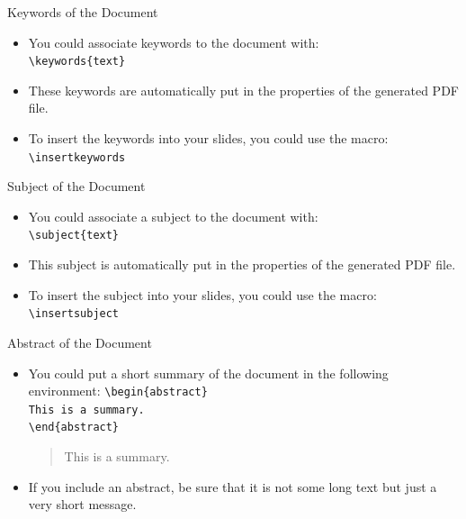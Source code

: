 \documentclass[english,sectioncirclenumberstyle]{le2iutbmbeamer}
\begin{document}
\begin{frame}{Keywords of the Document}
	\begin{itemize}
	\item You could associate keywords to the document with: \\
		\texttt{{\textbackslash}keywords\{text\}}
	\vspace{1em}
	\item These keywords are automatically put in the properties of the generated PDF file.
	\vspace{1em}
	\item To insert the keywords into your slides, you could use the macro: \\
			\texttt{{\textbackslash}insertkeywords}
	\end{itemize}
	\begin{example}
		\insertkeywords
	\end{example}
\end{frame}

\begin{frame}{Subject of the Document}
	\begin{itemize}
	\item You could associate a subject to the document with: \\
		\texttt{{\textbackslash}subject\{text\}}
	\vspace{1em}
	\item This subject is automatically put in the properties of the generated PDF file.
	\vspace{1em}
	\item To insert the subject into your slides, you could use the macro: \\
			\texttt{{\textbackslash}insertsubject}
	\end{itemize}
	\begin{example}
		\insertsubject
	\end{example}
\end{frame}

\begin{frame}{Abstract of the Document}
	\begin{itemize}
	\item You could put a short summary of the document in the following environment:
		\texttt{{\textbackslash}begin\{abstract\}} \\
		\texttt{This is a summary.} \\
		\texttt{{\textbackslash}end\{abstract\}}
	\vspace{1em}
	\begin{abstract}
		This is a summary.
	\end{abstract}
	\item If you include an abstract, be sure that it is not some long text but just a very short message.
	\end{itemize}
\end{frame}
\end{document}
